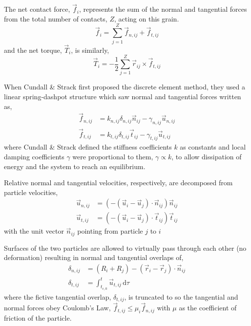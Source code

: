 \documentclass[11pt]{report} %
\begin{document}
The net contact force, $\vec{f}_i$, represents the sum of the normal and tangential forces from the total number of contacts, $Z$, acting on this grain.
\begin{equation}
 	\vec{f}_i = \sum_{j=1}^{Z} \vec{f}_{n,ij} + \vec{f}_{t,ij}
 \end{equation} 
and the net torque, $\vec{T}_i$, is similarly,
\begin{equation}
	\vec{T}_i = -\frac{1}{2}\sum_{j=1}^{Z} \vec{r}_{ij} \times \vec{f}_{t,ij}
\end{equation}

When Cundall \& Strack first proposed the discrete element method, they used a linear spring-dashpot structure which saw normal and tangential forces written as,
\begin{subequations}
\label{eq:dem-forces}
\begin{align}
	\vec{f}_{n,ij} &= k_{n,ij} \delta_{n,ij}\vec{n}_{ij} - \gamma_{n,ij} \vec{u}_{n,ij} 	\label{eq:normal-force} \\
	\vec{f}_{t,ij} &= k_{t,ij} \delta_{t,ij}\vec{t}_{ij} - \gamma_{t,ij} \vec{u}_{t,ij} 	\label{eq:tangential-force}
\end{align}
\end{subequations}
where Cundall \& Strack defined the stiffness coefficients $k$ as constants and local damping coefficients $\gamma$ were proportional to them, $\gamma \propto k$, to allow dissipation of energy and the system to reach an equilibrium. 

Relative normal and tangential velocities, respectively, are decomposed from particle velocities,
\begin{subequations}
\label{eq:dem-velocities}
\begin{align}
	\vec{u}_{n,ij} &= (-(\vec{u}_i-\vec{u}_j)\cdot\vec{n}_{ij})\vec{n}_{ij} \\
	\vec{u}_{t,ij} &= (-(\vec{u}_i-\vec{u}_j)\cdot\vec{t}_{ij})\vec{t}_{ij}
\end{align}
\end{subequations}
with the unit vector $\vec{n}_{ij}$ pointing from particle $j$ to $i$

Surfaces of the two particles are allowed to virtually pass through each other (no deformation) resulting in normal and tangential overlaps of,
\begin{subequations}
\label{eq:dem-overlaps}
\begin{align}
	\delta_{n,ij} &= (R_i + R_j) - (\vec{r}_i -\vec{r}_j)\cdot \vec{n}_{ij} \\
	\delta_{t,ij} &= \int_{t_{c,0}}^{t} \vec{u}_{t,ij}\,\mathrm{d}\tau 
\end{align}
\end{subequations}
where the fictive tangential overlap, $\delta_{t,ij}$, is truncated to so the tangential and normal forces obey Coulomb's Law, $\vec{f}_{t,ij} \le \mu_i \vec{f}_{n,ij}$ with $\mu$ as the coefficient of friction of the particle.
\end{document}
